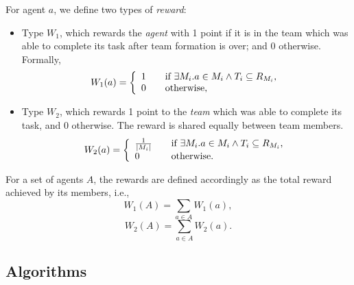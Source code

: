 \documentclass{llncs}
\begin{document}
\begin{definition}[Rewards]
For agent $a$, we define two types of \emph{reward}:
\begin{itemize}
    \item Type $W_1$, which rewards the \emph{agent} with 1 point if it is in the team which was able to complete its task after team formation is over; and 0 otherwise. Formally,
    \begin{equation} \label{eq:w1agent}
W_1(a) = \left\{
  \begin{array}{l l}
    1 & \quad \text{if $\exists M_i . a \in M_i \wedge T_i \subseteq R_{M_i}$,}\\
    0 & \quad \text{otherwise,}\\
  \end{array} \right.
\end{equation}

    \item Type $W_2$, which rewards 1 point to the \emph{team} which was able to complete its task, and 0 otherwise. The reward is shared equally between team members.
\begin{equation}
W_2(a) = \left\{
  \begin{array}{l l}
    \frac{1}{|M_i|} & \quad \text{if $\exists M_i . a \in M_i \wedge T_i \subseteq R_{M_i}$,}\\
    0 & \quad \text{otherwise.}\\
  \end{array} \right.
\label{eq:w2agent}
\end{equation}
\end{itemize}


For a set of agents $A$, the rewards are defined accordingly as the total reward achieved by its members, i.e.,
\begin{equation}
 W_1(A) = \sum_{a \in A} W_1(a),
\label{eq:w1organisation}
\end{equation}
\begin{equation}
 W_2(A) = \sum_{a \in A} W_2(a).
\label{eq:w2organisation}
\end{equation}
\end{definition}


\subsection{Algorithms}
\end{document}
